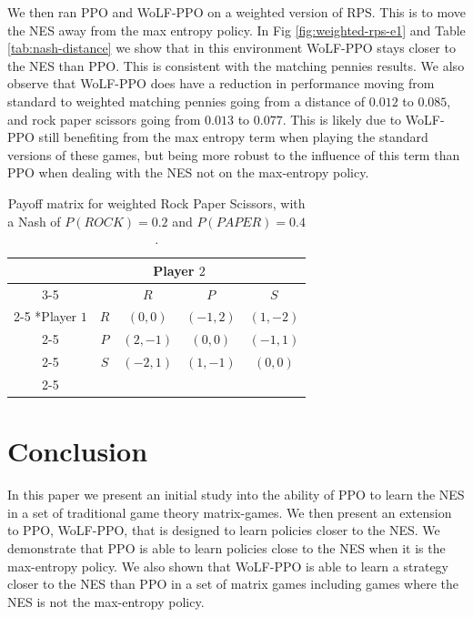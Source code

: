 \documentclass[conference]{IEEEtran}
\newcommand\REVIEW[1]{{\color{blue} #1}}
\begin{document}
We then ran PPO and WoLF-PPO on a weighted version of RPS. This is to move the NES away from the max entropy policy. In Fig \ref{fig:weighted-rps-e1} and Table \ref{tab:nash-distance} we show that in this environment WoLF-PPO stays closer to the NES than PPO. This is consistent with the matching pennies results.
\REVIEW{
    We also observe that WoLF-PPO does have a reduction in performance moving from standard to weighted matching pennies going from a distance of $0.012$ to $0.085$, and rock paper scissors going from $0.013$ to $0.077$. This is likely due to WoLF-PPO still benefiting from the max entropy term when playing the standard versions of these games, but being more robust to the influence of this term than PPO when dealing with the NES not on the max-entropy policy.
}

\begin{table}[!ht]
    \centering
    \caption{Payoff matrix for weighted Rock Paper Scissors, with a Nash of $P(ROCK)=0.2$ and $P(PAPER)=0.4$.}
    \setlength{\extrarowheight}{2pt}
    \begin{tabular}{*{5}{c|}}
      \multicolumn{2}{c}{} & \multicolumn{2}{c}{Player $2$}\\\cline{3-5}
      \multicolumn{1}{c}{} &  & $R$  & $P$ & $S$ \\\cline{2-5}
      \multirow{2}*{Player $1$}  & $R$ & $(0,0)$ & $(-1,2)$ & $(1,-2)$ \\\cline{2-5}
      & $P$ & $(2,-1)$ & $(0,0)$ & $(-1,1)$ \\\cline{2-5}
      & $S$ & $(-2,1)$ & $(1,-1)$ & $(0,0)$ \\\cline{2-5}
    \end{tabular}
    \label{tab:weighted-rps}
\end{table}

\section{Conclusion}


In this paper we present an initial study into the ability of PPO to learn the NES in a set of traditional game theory matrix-games. We then present an extension to PPO, WoLF-PPO, that is designed to learn policies closer to the NES. We demonstrate that PPO is able to learn policies close to the NES when it is the max-entropy policy. We also shown that WoLF-PPO is able to learn a strategy closer to the NES than PPO in a set of matrix games including games where the NES is not the max-entropy policy.
\end{document}

